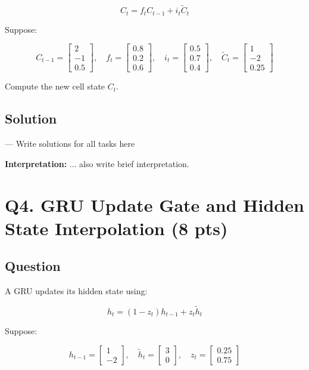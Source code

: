 \documentclass[11pt]{article}
\begin{document}
\[
C_t = f_t C_{t-1} + i_t \widetilde{C}_t
\]

Suppose:

\[
C_{t-1} =
\begin{bmatrix}
2\\
-1\\
0.5
\end{bmatrix},
\quad
f_t =
\begin{bmatrix}
0.8\\
0.2\\
0.6
\end{bmatrix},
\quad
i_t =
\begin{bmatrix}
0.5\\
0.7\\
0.4
\end{bmatrix},
\quad
\widetilde{C}_t =
\begin{bmatrix}
1\\
-2\\
0.25
\end{bmatrix}
\]

Compute the new cell state \(C_t\).

\subsection*{Solution}

--- Write solutions for all tasks here 

\noindent \textbf{Interpretation:} ... also write brief interpretation.

\section*{Q4. GRU Update Gate and Hidden State Interpolation (8 pts)}

\subsection*{Question}

A GRU updates its hidden state using:

\[
h_t = (1-z_t)h_{t-1} + z_t \widetilde{h}_t
\]

Suppose:

\[
h_{t-1} =
\begin{bmatrix}
1\\
-2
\end{bmatrix},
\quad
\widetilde{h}_t =
\begin{bmatrix}
3\\
0
\end{bmatrix},
\quad
z_t =
\begin{bmatrix}
0.25\\
0.75
\end{bmatrix}
\]
\end{document}
